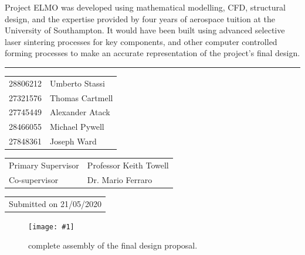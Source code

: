 \documentclass[11pt,landscape]{report}
\newcommand{\appendixtable}[2]{
    \begin{table}[H]
        \begin{tabular}{#1}
            #2
        \end{tabular}
    \end{table}
}
\newcommand{\importimage}[4]{
    \begin{figure}[H]
        \begin{center}
        \texttt{[image: \#1]}
        \caption[#3]{#2}
        \label{fig:#1}  %
        \end{center}
    \end{figure}
}
\begin{document}
\begin{multicols*}{2}
\begin{titlepage}
{        Project ELMO was developed using mathematical modelling, CFD, structural design, and the expertise provided by four years of aerospace tuition at the University of Southampton.
        It would have been built using advanced selective laser sintering processes for key components, and other computer controlled forming processes to make an accurate representation of the project's final design. 
    } %
    \par\noindent\rule{\columnwidth}{0.4pt}
    \appendixtable{l l}{
        28806212 & Umberto Stassi \\
        27321576 & Thomas Cartmell \\
        27745449 & Alexander Atack \\
        28466055 & Michael Pywell \\
        27848361 & Joseph Ward \\
    }
    \appendixtable{l l}{
        Primary Supervisor & Professor Keith Towell \\
        Co-supervisor & Dr. Mario Ferraro \\
    }
    \appendixtable{l}{Submitted on 21/05/2020}

\end{titlepage}
\end{multicols*}

\begin{multicols*}{3}

\begingroup
\let\clearpage\relax
\tableofcontents
\endgroup






\end{multicols*}
\importimage{elmo-render}{complete assembly of the final design proposal.}{Final design}{0.85}
\clearpage
\begin{multicols*}{3}




\end{multicols*}

\begin{multicols*}{2}


\end{multicols*}
\end{document}
